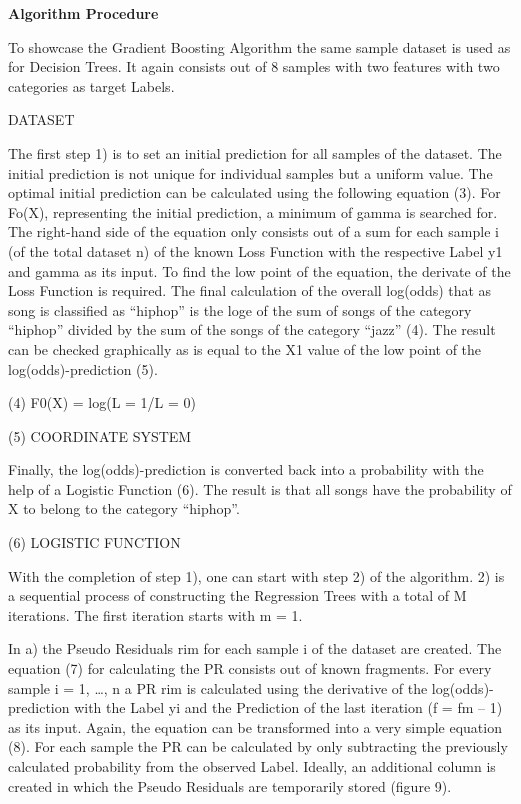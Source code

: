 \textbf{Algorithm Procedure}

To showcase the Gradient Boosting Algorithm the same sample dataset is used as for Decision Trees. 
It again consists out of 8 samples with two features with two categories as target Labels. 

DATASET 

The first step 1) is to set an initial prediction for all samples of the dataset. The initial 
prediction is not unique for individual samples but a uniform value. The optimal initial 
prediction can be calculated using the following equation (3). For Fo(X), representing the 
initial prediction, a minimum of gamma is searched for. The right-hand side of the equation 
only consists out of a sum for each sample i (of the total dataset n) of the known Loss Function 
with the respective Label y1 and gamma as its input. To find the low point of the equation, 
the derivate of the Loss Function is required. The final calculation of the overall log(odds) 
that as song is classified as “hiphop” is the loge of the sum of songs of the category “hiphop” 
divided by the sum of the songs of the category “jazz” (4). The result can be checked graphically 
as is equal to the X1 value of the low point of the log(odds)-prediction (5). 

(4) F0(X) = log(L = 1/L = 0) 

(5) COORDINATE SYSTEM

Finally, the log(odds)-prediction is converted back into a probability with the help of a 
Logistic Function (6). The result is that all songs have the probability of X to belong to 
the category “hiphop”.

(6) LOGISTIC FUNCTION 

With the completion of step 1), one can start with step 2) of the algorithm. 2) is a sequential 
process of constructing the Regression Trees with a total of M iterations. The first iteration 
starts with m = 1. 

In a) the Pseudo Residuals rim for each sample i of the dataset are created. The equation (7) 
for calculating the PR consists out of known fragments. For every sample i = 1, …, n a PR rim 
is calculated using the derivative of the log(odds)-prediction with the Label yi and the 
Prediction of the last iteration (f = fm – 1) as its input. Again, the equation can be 
transformed into a very simple equation (8). For each sample the PR can be calculated by only 
subtracting the previously calculated probability from the observed Label. Ideally, an additional 
column is created in which the Pseudo Residuals are temporarily stored (figure 9). 

